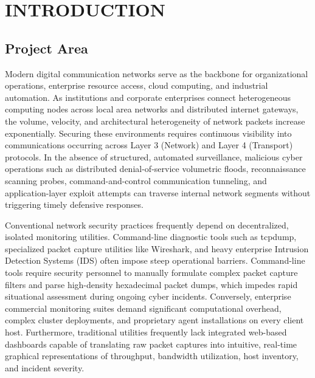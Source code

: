 \documentclass[a4paper,12pt]{report}
\begin{document}
	\listoffigures
	\newpage
	
	\listoftables
	\clearpage
	
	\chapter{INTRODUCTION}
	
	\section{Project Area}
	\par
	Modern digital communication networks serve as the backbone for organizational operations, enterprise resource access, cloud computing, and industrial automation. As institutions and corporate enterprises connect heterogeneous computing nodes across local area networks and distributed internet gateways, the volume, velocity, and architectural heterogeneity of network packets increase exponentially. Securing these environments requires continuous visibility into communications occurring across Layer 3 (Network) and Layer 4 (Transport) protocols. In the absence of structured, automated surveillance, malicious cyber operations such as distributed denial-of-service volumetric floods, reconnaissance scanning probes, command-and-control communication tunneling, and application-layer exploit attempts can traverse internal network segments without triggering timely defensive responses.
	
	Conventional network security practices frequently depend on decentralized, isolated monitoring utilities. Command-line diagnostic tools such as tcpdump, specialized packet capture utilities like Wireshark, and heavy enterprise Intrusion Detection Systems (IDS) often impose steep operational barriers. Command-line tools require security personnel to manually formulate complex packet capture filters and parse high-density hexadecimal packet dumps, which impedes rapid situational assessment during ongoing cyber incidents. Conversely, enterprise commercial monitoring suites demand significant computational overhead, complex cluster deployments, and proprietary agent installations on every client host. Furthermore, traditional utilities frequently lack integrated web-based dashboards capable of translating raw packet captures into intuitive, real-time graphical representations of throughput, bandwidth utilization, host inventory, and incident severity.
	
\end{document}
